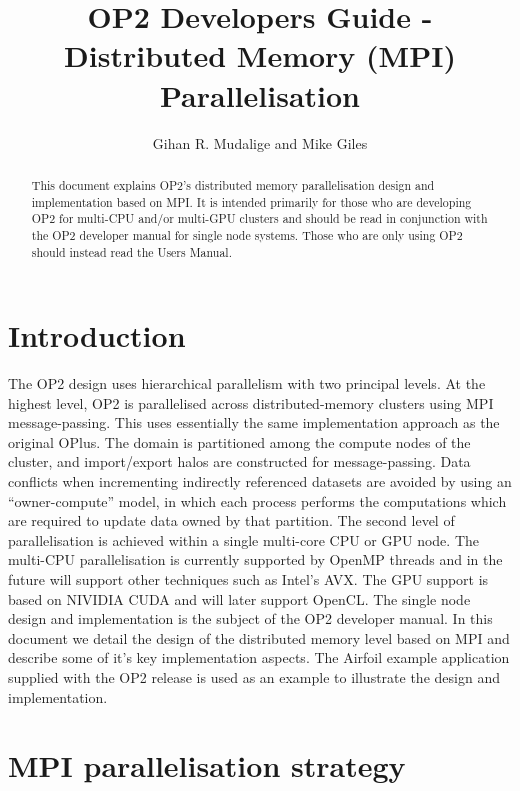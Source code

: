 \documentclass[12pt]{article}
\begin{document}
\title{OP2 Developers Guide - Distributed Memory (MPI) Parallelisation}
\author{Gihan R. Mudalige and Mike Giles}

\maketitle

\begin{abstract}
\noindent This document explains OP2's distributed memory parallelisation 
design and implementation based on MPI.  It is intended primarily for those 
who are developing OP2 for multi-CPU and/or multi-GPU clusters and should be 
read in conjunction with the OP2 developer manual for single node systems.
Those who are only using OP2 should instead read the Users Manual.  
\end{abstract}


\tableofcontents

\newpage

\section{Introduction}
The OP2 design uses hierarchical parallelism with two principal levels. At the highest level, OP2 is parallelised across
distributed-memory clusters using MPI message-passing.  This uses essentially the same implementation approach as the
original OPlus.  The domain is partitioned among the compute nodes of the cluster, and import/export halos are
constructed for message-passing.  Data conflicts when  incrementing indirectly referenced datasets are avoided by using
an ``owner-compute'' model, in which each process performs the computations which are required to update data owned by
that partition.  The second level of parallelisation is achieved within a single multi-core CPU or GPU node. The
multi-CPU parallelisation is currently supported by OpenMP threads and in the future will support other techniques such
as Intel's AVX. The GPU support is based on NIVIDIA CUDA and will later support OpenCL. The single node design and
implementation is the subject of the OP2 developer manual. In this document we detail the design of the distributed
memory level based on MPI and describe some of it's key implementation aspects. The Airfoil example application supplied
with the OP2 release is used as an example to illustrate the design and implementation.



 
\section{MPI parallelisation strategy}
\end{document}
